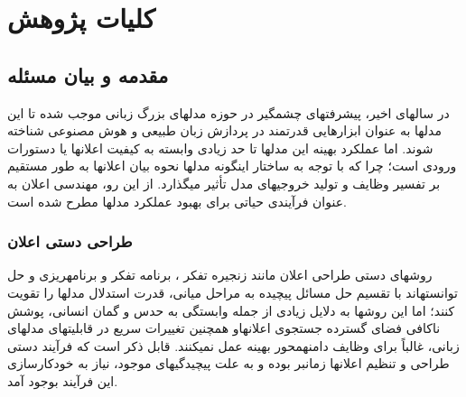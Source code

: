 \clearpage
\thispagestyle{empty}
\chapter{کلیات پژوهش}\label{chap1}
\section{مقدمه و بیان مسئله}\label{intro}
در سال\/های اخیر، پیشرفت\/های چشمگیر در حوزه مدل\/های بزرگ زبانی 
 موجب شده تا این مدل\/ها به عنوان ابزارهایی قدرتمند در پردازش زبان طبیعی
  و هوش مصنوعی شناخته شوند. اما عملکرد بهینه این مدل\/ها تا حد زیادی وابسته به کیفیت اعلان\/ها
   یا دستورات ورودی است؛ چرا که با توجه به ساختار این\/گونه مدل\/ها
    نحوه بیان اعلان\/ها به طور مستقیم بر تفسیر وظایف و تولید خروجی\/های مدل تأثیر می\/گذارد. از این رو، مهندسی اعلان
     به عنوان فرآیندی حیاتی برای بهبود عملکرد مدل\/ها مطرح شده است.

\subsection{طراحی دستی اعلان}
روش\/های دستی طراحی اعلان مانند
 زنجیره تفکر \cite{CoT}
 ، 
 برنامه تفکر \cite{PoT} 
 و
 برنامه\/ریزی و حل \cite{PS}
 توانسته\/اند با تقسیم حل مسائل پیچیده به مراحل میانی، قدرت استدلال مدل\/ها را تقویت کنند؛ اما این روش\/ها به دلایل زیادی از جمله وابستگی به حدس و گمان انسانی، پوشش ناکافی فضای گسترده جستجوی اعلان\/هاو همچنین تغییرات سریع در قابلیت\/های مدل\/های زبانی، غالباً برای وظایف دامنه\/محور بهینه عمل نمی\/کنند. قابل ذکر است که فرآیند دستی طراحی و تنظیم اعلان\/ها زمان\/بر بوده و به علت پیچیدگی\/های موجود، نیاز به خودکارسازی این فرآیند بوجود آمد.

